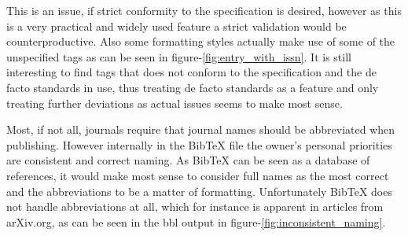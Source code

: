 This is an issue, if strict conformity to the specification is desired,
however as this is a very practical and widely used feature a strict
validation would be counterproductive.  Also some formatting styles
actually make use of some of the unspecified tags as can be seen in
figure-\ref{fig:entry_with_issn}. It is still interesting to find tags
that does not conform to the specification and the de facto standards
in use, thus treating de facto standards as a feature and only treating
further deviations as actual issues seems to make most sense. 



Most, if not all, journals require that journal names should be
abbreviated when publishing.  However internally in the Bib{\TeX} file
the owner's personal priorities are consistent and correct naming.  As
Bib{\TeX} can be seen as a database of references, it would make most
sense to consider full names as the most correct and the abbreviations
to be a matter of formatting.  Unfortunately Bib{\TeX} does not handle
abbreviations at all, which for instance is apparent in articles from
arXiv.org, as can be seen in the bbl output in
figure-\ref{fig:inconsistent_naming}.


